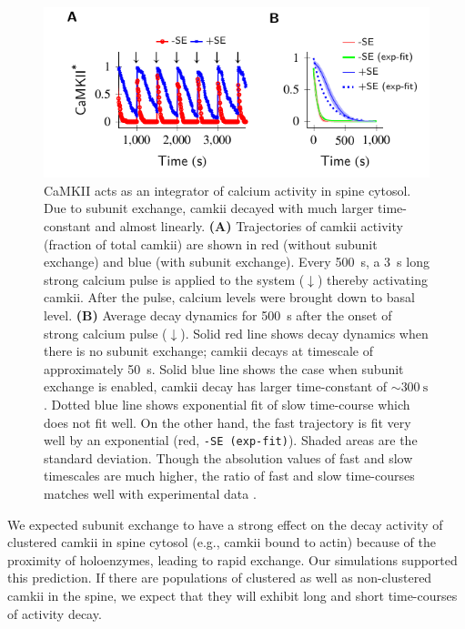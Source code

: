 \documentclass[9pt,lineno,doublespacing]{elife}
\begin{document}
\begin{figure}%
    \includegraphics[]{PaperFigures/elifeFigure6/figure_two_timecourses_87mm.pdf}
    \caption{CaMKII acts as an integrator of calcium activity in spine cytosol.
        Due to subunit exchange, \gls{camkii} decayed with much larger
        time-constant and almost linearly. \textbf{(A)} Trajectories
        of \gls{camkii} activity (fraction of total \gls{camkii})
        are shown in red (without subunit exchange) and blue (with
        subunit exchange). Every \SI{500}{\second}, a \SI{3}{\second}
        long strong calcium pulse is applied to the system ($\downarrow$)
        thereby activating \gls{camkii}.  After the pulse, calcium levels
        were brought down to basal level. \textbf{(B)} Average decay
        dynamics for \SI{500}{\second} after the onset of strong calcium
        pulse ($\downarrow$). Solid red line shows decay dynamics when
        there is no subunit exchange; \gls{camkii} decays at timescale of
        approximately \SI{50}{\second}. Solid blue line shows the case when
        subunit exchange is enabled, \gls{camkii} decay has larger
        time-constant of $\sim\SI{300}{\second}$. Dotted blue line shows exponential
        fit of slow time-course which does not fit well. On the other hand, the fast
        trajectory is fit very well by an exponential (red, \texttt{-SE (exp-fit)}). 
        Shaded areas are the standard deviation. Though the absolution values of 
        fast and slow timescales are much higher, the ratio of fast and slow time-courses
        matches well with experimental data \citep{chang_camkii_2017}.
    }\label{fig:cytosol_integrator}
\end{figure}

We expected subunit exchange to have a strong effect on the decay activity of 
clustered \gls{camkii} in spine cytosol (e.g., \gls{camkii} bound to actin)
because of the proximity of holoenzymes, leading to rapid exchange. 
Our simulations supported this prediction. If there are populations of 
clustered as well as non-clustered \gls{camkii} in the spine, we expect that
they will exhibit long and short time-courses of activity decay.
\end{document}
